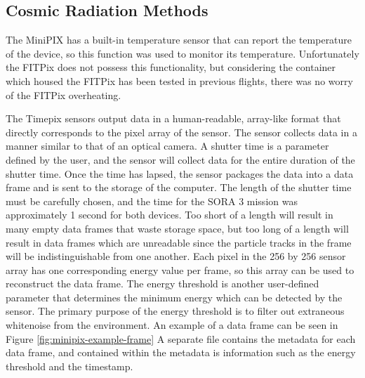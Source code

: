 \subsection{Cosmic Radiation Methods}
\label{sec:Cosmic-Radiation-Methods}

The MiniPIX has a built-in temperature sensor that can report the temperature of the device, so this function was used to monitor its temperature.
Unfortunately the FITPix does not possess this functionality, but considering the container which housed the FITPix has been tested in previous flights, there was no worry of the FITPix overheating.

The Timepix sensors output data in a human-readable, array-like format that directly corresponds to the pixel array of the sensor.
The sensor collects data in a manner similar to that of an optical camera.
A shutter time is a parameter defined by the user, and the sensor will collect data for the entire duration of the shutter time.
Once the time has lapsed, the sensor packages the data into a data frame and is sent to the storage of the computer.
The length of the shutter time must be carefully chosen, and the time for the SORA 3 mission was approximately 1 second for both devices.
Too short of a length will result in many empty data frames that waste storage space, but too long of a length will result in data frames which are unreadable since the particle tracks in the frame will be indistinguishable from one another.
Each pixel in the 256 by 256 sensor array has one corresponding energy value per frame, so this array can be used to reconstruct the data frame.
The energy threshold is another user-defined parameter that determines the minimum energy which can be detected by the sensor.
The primary purpose of the energy threshold is to filter out extraneous whitenoise from the environment.
An example of a data frame can be seen in Figure \ref{fig:minipix-example-frame}
A separate file contains the metadata for each data frame, and contained within the metadata is information such as the energy threshold and the timestamp.

